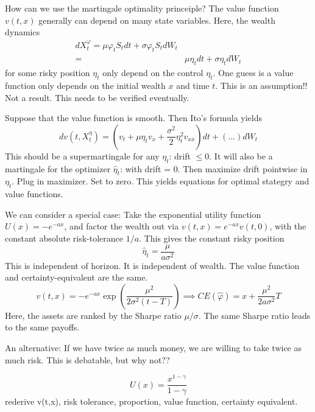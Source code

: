 \documentclass[twocolumn,openany]{book}
\begin{document}
How can we use the martingale optimality princeiple? The value function $v(t,x)$ generally can depend on many state variables. Here, the wealth dynamics
\begin{align}
	d X_t^\varphi = \mu \varphi_t S_t dt + \sigma \varphi_t S_t dW_t\\
			=& \mu \eta_t dt + \sigma \eta_t dW_t
\end{align}
for some risky position $\eta_t$ only depend on the control $\eta_t$. One guess is a value function only depends on the initial wealth $x$ and time $t$. This is an assumption!! Not a result. This needs to be verified eventually.

Suppose that the value function is smooth. Then Ito's formula yields
\begin{equation}
	dv(t, X^\eta_t) = (v_t + \mu \eta_t v_x + \frac{\sigma^2}{2}\eta^2_t v_{xx})dt + (...) dW_t
\end{equation}
This should be a supermartingale for any $\eta_t$: drift $\leq 0$. It will also be a martingale for the optimizer $\hat{\eta}_t$: with drift = 0. Then maximize drift pointwise in $\eta_t$. Plug in maximizer. Set to zero. This yields equations for optimal stategry and value functions.


We can consider a special case: Take the exponential utility function $U(x) = -e^{-ax}$, and factor the wealth out via $v(t,x) = e^{-ax}v(t,0)$, with the constant absolute risk-tolerance $1/a$. This gives the constant risky position
\begin{equation}
	\hat{\eta}_t = \frac{\mu}{a \sigma^2}
\end{equation}
This is independent of horizon. It is independent of wealth. The value function and certainty-equivalent are the same.
\begin{equation}
	v(t,x) = -e^{-ax} \exp(\frac{\mu^2}{2\sigma^2(t-T)}) \implies CE(\hat{\varphi}) = x + \frac{\mu^2}{2 a \sigma^2} T
\end{equation}
Here, the assets are ranked by the Sharpe ratio $\mu/\sigma$. The same Sharpe ratio leads to the same payoffs.


An alternative: If we have twice as much money, we are willing to take twice as much risk. This is debatable, but why not??

\begin{equation}
	U(x) = \frac{x^{1-\gamma}}{1-\gamma} 
\end{equation}
rederive v(t,x), risk tolerance, proportion, value function, certainty equivalent.
\end{document}
